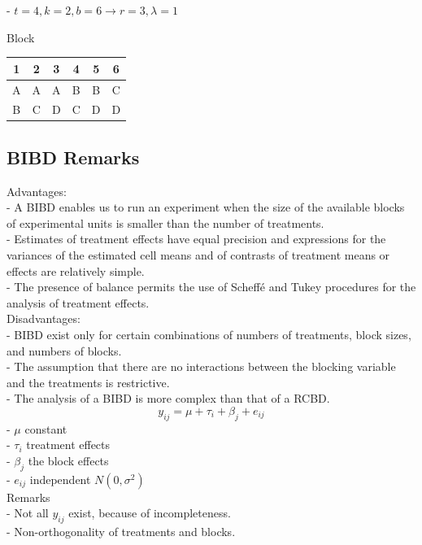 \documentclass[11pt,a4paper]{article}
\begin{document}
- $t=4, k=2, b=6 \rightarrow r=3, \lambda=1$
\begin{center}
Block\\
\begin{tabular}{|c|c|c|c|c|c|}
\hline 1 & 2 & 3 &4 &5&6 \\
\hline A & A & A& B & B & C \\
\hline B& C & D & C & D & D \\
\hline
\end{tabular}
\end{center}


\subsection{ BIBD Remarks}
Advantages:\\
- A BIBD enables us to run an experiment when the size of the available blocks of experimental units is smaller than the number of treatments.\\
- Estimates of treatment effects have equal precision and expressions for the variances of the estimated cell means and of contrasts of treatment means or effects are relatively simple.\\
- The presence of balance permits the use of Scheffé and Tukey procedures for the analysis of treatment effects.\\

Disadvantages:\\
- BIBD exist only for certain combinations of numbers of treatments, block sizes, and numbers of blocks.\\
- The assumption that there are no interactions between the blocking variable and the treatments is restrictive.\\
- The analysis of a BIBD is more complex than that of a RCBD.\\

$$
y_{i j}=\mu+\tau_{i}+\beta_{j}+e_{i j}
$$
- $\mu$ constant\\
- $\tau_{i}$ treatment effects\\
- $\beta_{j}$ the block effects\\
- $e_{i j}$ independent $N\left(0, \sigma^{2}\right)$\\

Remarks\\
- Not all $y_{i j}$ exist, because of incompleteness.\\
- Non-orthogonality of treatments and blocks.\\
\end{document}
